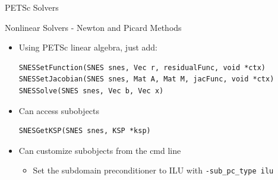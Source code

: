 \begin{frame}[fragile]{PETSc Solvers}

\begin{block}{Nonlinear Solvers - Newton and Picard Methods}
\begin{itemize}
  \item Using PETSc linear algebra, just add:
  \begin{lstlisting}[basicstyle=\footnotesize\ttfamily]
SNESSetFunction(SNES snes, Vec r, residualFunc, void *ctx)
SNESSetJacobian(SNES snes, Mat A, Mat M, jacFunc, void *ctx)
SNESSolve(SNES snes, Vec b, Vec x)
  \end{lstlisting}

  \item Can access subobjects
  \begin{lstlisting}[basicstyle=\footnotesize\ttfamily]
SNESGetKSP(SNES snes, KSP *ksp)
  \end{lstlisting}

  \item Can customize subobjects from the cmd line
  \begin{itemize}
    \item Set the subdomain preconditioner to ILU with \lstinline|-sub_pc_type ilu|
  \end{itemize}
\end{itemize}
\end{block}

\end{frame}

